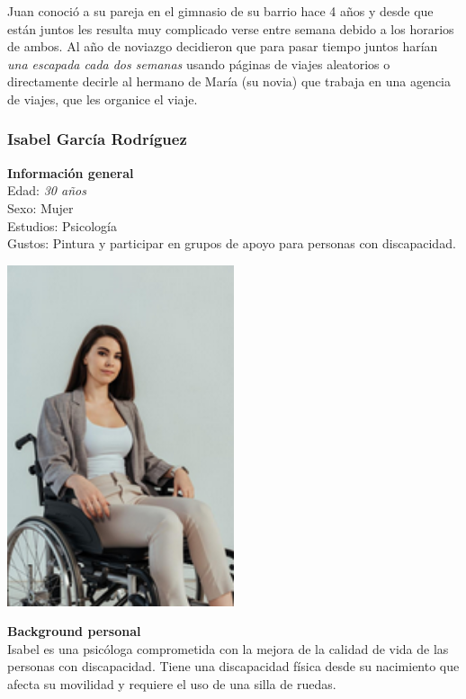 Juan conoció a su pareja en el gimnasio de su barrio hace 4 años y desde que están juntos les resulta muy complicado verse entre semana debido a los horarios de ambos. Al año de noviazgo decidieron que para pasar tiempo juntos harían \textit{una escapada cada dos semanas} usando páginas de viajes aleatorios o directamente decirle al hermano de María (su novia) que trabaja en una agencia de viajes, que les organice el viaje.

\subsubsection{Isabel García Rodríguez}
\begin{minipage}{0.4\textwidth}
    \textbf{Información general} \\

    Edad: \textit{30 años} \\
    Sexo: Mujer \\
    Estudios: Psicología \\
    Gustos: Pintura y participar en grupos de apoyo para personas con discapacidad. \\
\end{minipage}
\hfill
\begin{minipage}{0.4\textwidth}
    \includegraphics[width=0.5\textwidth]{Imagenes/Personas/Isabel.png}
\end{minipage}

\textbf{Background personal} \\

Isabel es una psicóloga comprometida con la mejora de la calidad de vida de las personas con discapacidad. Tiene una discapacidad física desde su nacimiento que afecta su movilidad y requiere el uso de una silla de ruedas. \\

